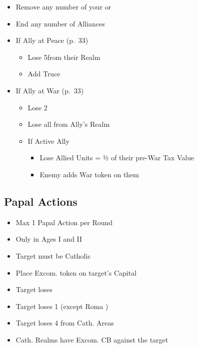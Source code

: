 \documentclass[10pt]{article}
\begin{document}
\begin{itemize}
	\item Remove any number of your \influence or \claims
	\item End any number of Alliances
	\item If Ally at Peace (p.~33)
	\begin{itemize}
		\item Lose 5\influence from their Realm
		\item Add Truce
	\end{itemize}
	\item If Ally at War (p.~33)
	\begin{itemize}
		\item Lose 2\stability
		\item Lose all \influence from Ally's Realm
		\item If Active Ally
		\begin{itemize}
			\item Lose Allied Units = ½ of their pre-War Tax Value
			\item Enemy adds War token on them
		\end{itemize}
	\end{itemize}
\end{itemize}

\subsection*{Papal Actions }
\begin{itemize}
	\item Max 1 Papal Action per Round
	\item Only in Ages I and II
\end{itemize}

\begin{itemize}
	\item Target must be Catholic
	\item Place Excom. token on target's Capital
	\item Target loses 
	\item Target loses 1 \cardinal (except Roma \cardinal)
	\item Target loses 4 \influence from Cath. Areas
	\item Cath. Realms have Excom. CB against the target
\end{itemize}
\end{document}

